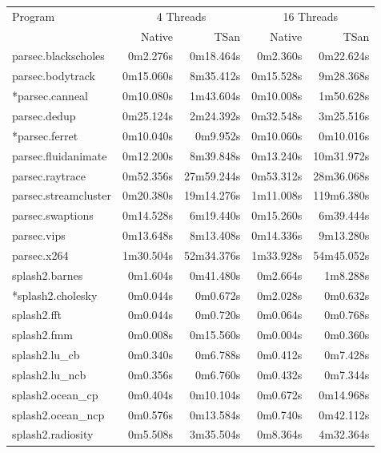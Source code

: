 \begin{table}[htbp]
\centering
\begin{tabular}{|l|r|r|r|r|}\hline \hline
 \multirow{2}{*}{Program} &  \multicolumn{2}{c|}{4 Threads } & \multicolumn{2}{c|}{16 Threads } \\ \cline{2-5}
	& Native & TSan & Native & TSan \\ \hline \hline
parsec.blackscholes	&	0m2.276s	&	0m18.464s	&	0m2.360s	&	0m22.624s	\\	\hline
parsec.bodytrack	&	0m15.060s	&	8m35.412s	&	0m15.528s	&	9m28.368s	\\	\hline
*parsec.canneal	&	0m10.080s	&	1m43.604s	&	0m10.008s	&	1m50.628s	\\	\hline
parsec.dedup	&	0m25.124s	&	2m24.392s	&	0m32.548s	&	3m25.516s	\\	\hline
*parsec.ferret	&	0m10.040s	&	0m9.952s	&	0m10.060s	&	0m10.016s	\\	\hline
parsec.fluidanimate	&	0m12.200s	&	8m39.848s	&	0m13.240s	&	10m31.972s	\\	\hline
parsec.raytrace	&	0m52.356s	&	27m59.244s	&	0m53.312s	&	28m36.068s	\\	\hline
parsec.streamcluster	&	0m20.380s	&	19m14.276s	&	1m11.008s	&	119m6.380s	\\	\hline
parsec.swaptions	&	0m14.528s	&	6m19.440s	&	0m15.260s	&	6m39.444s	\\	\hline
parsec.vips	&	0m13.648s	&	8m13.408s	&	0m14.336s	&	9m13.280s	\\	\hline
parsec.x264	&	1m30.504s	&	52m34.376s	&	1m33.928s	&	54m45.052s	\\	\hline
splash2.barnes	&	0m1.604s	&	0m41.480s	&	0m2.664s	&	1m8.288s	\\	\hline
*splash2.cholesky	&	0m0.044s	&	0m0.672s	&	0m2.028s	&	0m0.632s	\\	\hline
splash2.fft	&	0m0.044s	&	0m0.720s	&	0m0.064s	&	0m0.768s	\\	\hline
splash2.fmm	&	0m0.008s	&	0m15.560s	&	0m0.004s	&	0m0.360s	\\	\hline
splash2.lu\_cb	&	0m0.340s	&	0m6.788s	&	0m0.412s	&	0m7.428s	\\	\hline
splash2.lu\_ncb	&	0m0.356s	&	0m6.760s	&	0m0.432s	&	0m7.344s	\\	\hline
splash2.ocean\_cp	&	0m0.404s	&	0m10.104s	&	0m0.672s	&	0m14.968s	\\	\hline
splash2.ocean\_ncp	&	0m0.576s	&	0m13.584s	&	0m0.740s	&	0m42.112s	\\	\hline
splash2.radiosity	&	0m5.508s	&	3m35.504s	&	0m8.364s	&	4m32.364s	\\	\hline

\end{tabular}
\end{table}
